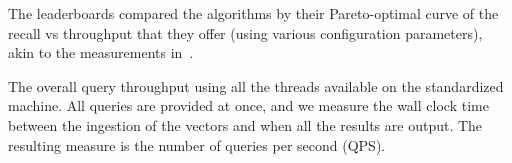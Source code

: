 The leaderboards compared the algorithms by their Pareto-optimal
curve of the recall vs throughput that they offer (using various
configuration parameters), akin to the measurements in~\cite{Benchmark}. 


\iffalse 
The evaluation for tracks T1 and T2 will be run by the organizers on
normalized hardware.  T1: machine with 64GB RAM (memory shared by
index with OS and standard libraries); T2: same machine with an
additional 1 TB of SSD.  For T3, since the hardware is non standard,
the participants are expected run the evaluation themselves using the
evaluation scripts provided by the organizers.  Some T3 participants
may wish to send us their custom accelerator hardware for the
evaluation phase.  We will accommodate those requests on a case-by-case
basis.
\fi 








 The overall query
throughput using all the threads available on the standardized machine.
All queries are provided at once, and we measure the wall clock time
between the ingestion of the vectors and when all the results are
output. The resulting measure is the number of queries per second (QPS).



